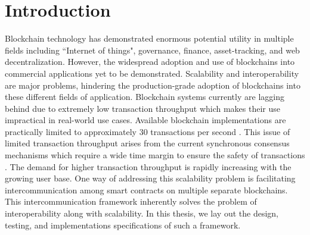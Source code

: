 \documentclass[a4paper,twoside,phd]{BYUPhys}
\begin{document}
 \frontmatter


 \makepreliminarypages


\doublespace
%

%

 \clearemptydoublepage
\singlespace
 \tableofcontents

\clearemptydoublepage
\listoffigures

\clearemptydoublepage
\listoftables

\clearemptydoublepage

\mainmatter
%
\chapter{Introduction}
\label{chap:Introduction}
Blockchain technology has demonstrated enormous potential utility in multiple fields including ``Internet of things", governance, finance, asset-tracking, and web decentralization. However, the widespread adoption and use of blockchains into commercial applications yet to be demonstrated.\cite{}
 Scalability and interoperability are major problems, hindering the production-grade adoption of blockchains into these different fields of application.\cite{} Blockchain systems currently are lagging behind due to extremely low transaction throughput which makes their use impractical in real-world use cases. Available blockchain implementations are practically limited to approximately 30 transactions per second \cite{}. This issue of limited transaction throughput arises from the current synchronous consensus mechanisms which require a wide time margin to ensure the safety of transactions \cite{}. The demand for higher transaction throughput is rapidly increasing with the growing user base. One way of addressing this scalability problem is facilitating intercommunication among smart contracts on multiple separate blockchains. This intercommunication framework inherently solves the problem of interoperability along with scalability. In this thesis, we lay out the design, testing, and implementations specifications of such a framework.
 
\end{document}
